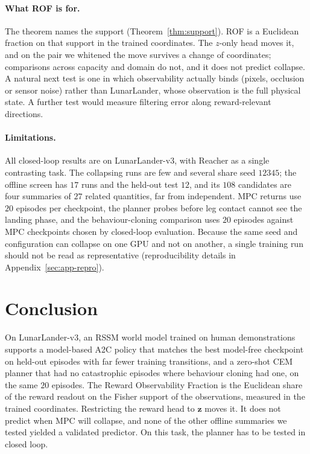 \documentclass[11pt]{article}
\theoremstyle{remark}
\begin{document}
\paragraph{What ROF is for.} The theorem names the support (Theorem~\ref{thm:support}). ROF is a Euclidean fraction on that support in the trained coordinates. The $z$-only head moves it, and on the pair we whitened the move survives a change of coordinates; comparisons across capacity and domain do not, and it does not predict collapse. A natural next test is one in which observability actually binds (pixels, occlusion or sensor noise) rather than LunarLander, whose observation is the full physical state. A further test would measure filtering error along reward-relevant directions.

\paragraph{Limitations.} All closed-loop results are on LunarLander-v3, with Reacher as a single contrasting task. The collapsing runs are few and several share seed $12345$; the offline screen has $17$ runs and the held-out test $12$, and its $108$ candidates are four summaries of $27$ related quantities, far from independent. MPC returns use $20$ episodes per checkpoint, the planner probes before leg contact cannot see the landing phase, and the behaviour-cloning comparison uses $20$ episodes against MPC checkpoints chosen by closed-loop evaluation. Because the same seed and configuration can collapse on one GPU and not on another, a single training run should not be read as representative (reproducibility details in Appendix~\ref{sec:app-repro}).

\section{Conclusion}
\label{sec:conclusion}

On LunarLander-v3, an RSSM world model trained on human demonstrations supports a model-based A2C policy that matches the best model-free checkpoint on held-out episodes with far fewer training transitions, and a zero-shot CEM planner that had no catastrophic episodes where behaviour cloning had one, on the same $20$ episodes. The Reward Observability Fraction is the Euclidean share of the reward readout on the Fisher support of the observations, measured in the trained coordinates. Restricting the reward head to $\bm{z}$ moves it. It does not predict when MPC will collapse, and none of the other offline summaries we tested yielded a validated predictor. On this task, the planner has to be tested in closed loop.
\end{document}
